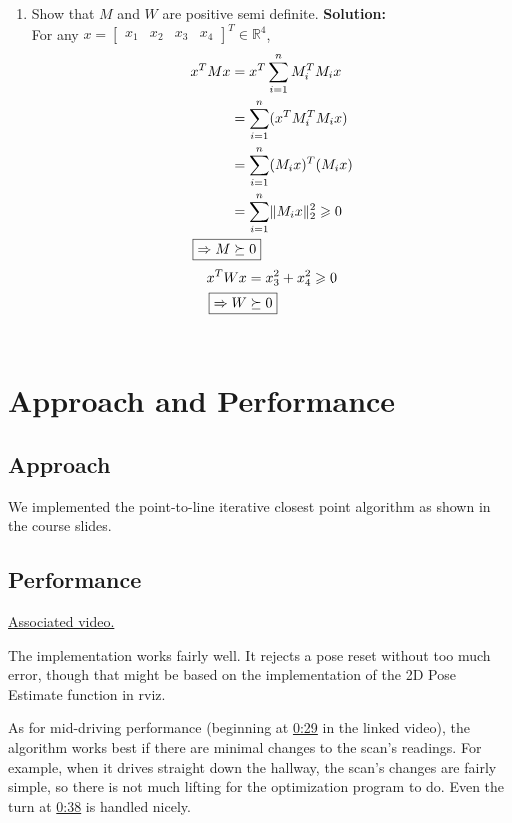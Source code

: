 \documentclass[letta4 paper]{article}
\DeclarePairedDelimiter{\norm}{\lVert}{\rVert}
\numberwithin{equation}{section}
\newcommand{\0}{\mathbf{0}}
\begin{document}
\begin{enumerate}
\begin{enumerate}
		\item Show that $M$ and $W$ are positive semi definite.
		\textbf{Solution:}
		\\
		For any $x = 
		\begin{bmatrix}
			x_1 & x_2 & x_3 & x_4         
		\end{bmatrix}^T \in \mathbb{R}^4$,
		\begin{align}
			x^T M x
			&=
			x^T \sum_{i=1}^{n}M_i^T M_i x\\
			&=
			\sum_{i=1}^{n} (x^T M_i^T M_i x) \\
			&=
			\sum_{i=1}^{n} (M_i x)^T (M_i x) \\
			&=
			\sum_{i=1}^{n} \norm{M_i x}_2^2 
			\geqslant
			0 \\
			\Aboxed{\Rightarrow M &\succeq 0}
		\end{align}
		\begin{align}
			x^T W x &= x_3^2 + x_4^2 \geqslant 0 \\ 
			\Aboxed{\Rightarrow W &\succeq 0}
		\end{align}
		\\		
		
	\end{enumerate}
	
\end{enumerate}

\section{Approach and Performance}

\subsection{Approach}

We implemented the point-to-line iterative closest point algorithm as shown in the course slides.

\subsection{Performance}

\href{https://youtu.be/OCojTZnd3rk}{Associated video.}

The implementation works fairly well. It rejects a pose reset without too much error, though that might be based on the implementation of the 2D Pose Estimate function in rviz. 

As for mid-driving performance (beginning at \href{https://youtu.be/OCojTZnd3rk?t=29}{0:29} in the linked video), the algorithm works best if there are minimal changes to the scan's readings. For example, when it drives straight down the hallway, the scan's changes are fairly simple, so there is not much lifting for the optimization program to do. Even the turn at \href{https://youtu.be/OCojTZnd3rk?t=38}{0:38} is handled nicely. 
\end{document}
